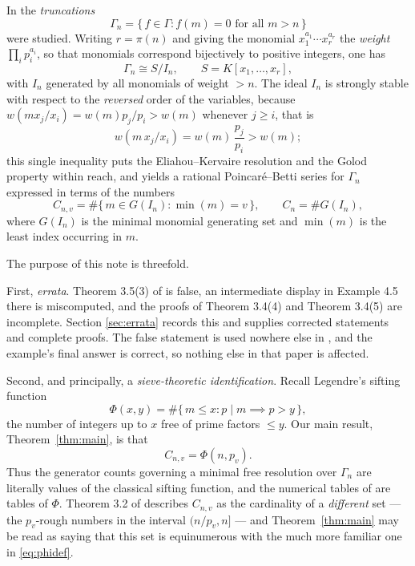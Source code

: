 \documentclass[a4paper,11pt,oneside,reqno]{amsart}
\theoremstyle{definition}
\theoremstyle{remark}
\theoremstyle{plain}
\newcommand{\Gam}{\Gamma}
\begin{document}
In \cite{Snellman2000} the \emph{truncations}
\begin{equation}
  \Gam_n = \{\,f \in \Gam : f(m) = 0\text{ for all }m > n\,\}
\end{equation}
were studied. Writing \(r = \pi(n)\) and giving the monomial
\(x_1^{a_1}\cdots x_r^{a_r}\) the \emph{weight} \(\prod_i p_i^{a_i}\), so that
monomials correspond bijectively to positive integers, one has
\begin{equation}\label{eq:GammaSI}
  \Gam_n \cong S/I_n,\qquad S = K[x_1,\dots,x_r],
\end{equation}
with \(I_n\) generated by all
monomials of weight \(>n\). The ideal \(I_n\) is strongly stable with respect to
the \emph{reversed} order of the variables, because
\(w(mx_j/x_i) = w(m)p_j/p_i > w(m)\) whenever \(j \ge i\), that is
\begin{equation}\label{eq:stable}
  w\!\left(m\,x_j/x_i\right) = w(m)\,\frac{p_j}{p_i} > w(m);
\end{equation}
this single inequality
puts the Eliahou--Kervaire resolution \cite{EliahouKervaire} and the Golod
property \cite{AramovaHerzog,Peeva,Golod,GulliksenLevin} within reach, and
yields a rational Poincaré--Betti series for \(\Gam_n\) expressed in terms of
the numbers
\begin{equation}\label{eq:Cdef}
  C_{n,v} = \#\{\,m \in G(I_n) : \min(m) = v\,\},\qquad C_n = \#G(I_n),
\end{equation}
where \(G(I_n)\) is the minimal monomial generating set and \(\min(m)\) is the
least index occurring in \(m\).

The purpose of this note is threefold.

First, \emph{errata}. Theorem 3.5(3) of \cite{Snellman2000} is false, an
intermediate display in Example 4.5 there is miscomputed, and the proofs of
Theorem 3.4(4) and Theorem 3.4(5) are incomplete. Section \ref{sec:errata}
records this and supplies corrected statements and complete proofs. The false
statement is used nowhere else in \cite{Snellman2000}, and the example's final
answer is correct, so nothing else in that paper is affected.

Second, and principally, a \emph{sieve-theoretic identification}. Recall
Legendre's sifting function
\begin{equation}\label{eq:phidef}
  \Phi(x,y) = \#\{\,m \le x : p \mid m \implies p > y\,\},
\end{equation}
the number of integers up to \(x\) free of prime factors \(\le y\). Our main
result, Theorem~\ref{thm:main}, is that
\begin{equation}
  \boxed{\;C_{n,v} = \Phi(n,p_v).\;}
\end{equation}
Thus the generator counts governing a minimal free resolution over \(\Gam_n\)
are literally values of the classical sifting function, and the numerical
tables of \cite{Snellman2000} are tables of \(\Phi\). Theorem 3.2 of
\cite{Snellman2000} describes \(C_{n,v}\) as the cardinality of a
\emph{different} set --- the \(p_v\)-rough numbers in the interval
\((n/p_v,n]\) --- and Theorem~\ref{thm:main} may be read as saying that this
set is equinumerous with the much more familiar one in \eqref{eq:phidef}.
\end{document}
